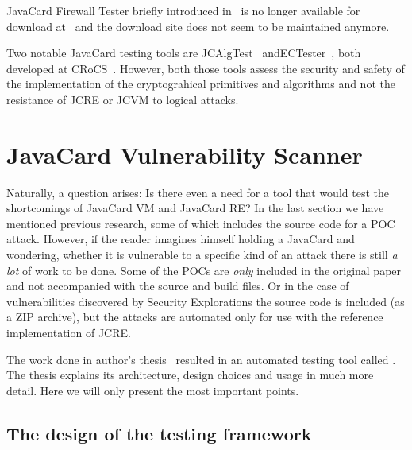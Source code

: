 \documentclass{../llncs/llncs}
\begin{document}

JavaCard Firewall Tester briefly introduced in~\cite{Mostowski07testingthe} is no longer available for download at~\cite{firewalltester} and the download site does not seem to be maintained anymore.

Two notable JavaCard testing tools are JCAlgTest~\cite{jcalgtest} and\linebreak ECTester~\cite{ectester}, both developed at CRoCS~\cite{crocsweb}. However, both those tools assess the security and safety of the implementation of the cryptograhical primitives and algorithms and not the resistance of JCRE or JCVM to logical attacks.

\section{JavaCard Vulnerability Scanner}\label{sec:javacard-vulnerability-scanner}
Naturally, a question arises: Is there even a need for a tool that would test the shortcomings of JavaCard VM and JavaCard RE?  In the last section we have mentioned previous research, some of which includes the source code for a POC attack. However, if the reader imagines himself holding a JavaCard and wondering, whether it is vulnerable to a specific kind of an attack there is still \textit{a lot} of work to be done. Some of the POCs are \textit{only} included in the original paper and not accompanied with the source and build files. Or in the case of vulnerabilities discovered by Security Explorations the source code is included (as a ZIP archive), but the attacks are automated only for use with the reference implementation of JCRE.

    The work done in author's thesis~\cite{anon2020thesis} resulted in an automated testing tool called \projectname. The thesis explains its architecture, design choices and usage in much more detail. Here we will only present the most important points.
    
    \subsection{The design of the testing framework}
\end{document}
